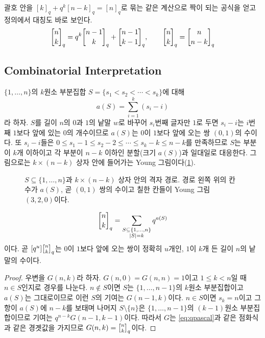 괄호 안을 $[k]_q+q^k[n-k]_q=[n]_q$로 묶는 같은 계산으로 짝이 되는 공식을 얻고 정의에서 대칭도 바로 보인다.
\[
\qbinom nk=q^k\qbinom{n-1}k+\qbinom{n-1}{k-1},\qquad\qbinom nk=\qbinom n{n-k}
\]

\subsection{Combinatorial Interpretation}

$\{1,\dots,n\}$의 $k$원소 부분집합 $S=\{s_1<s_2<\cdots<s_k\}$에 대해
\[
a(S)=\sum_{i=1}^k(s_i-i)
\]
라 하자. $S$를 길이 $n$의 $0$과 $1$의 낱말 $w$로 바꾸어 $s_i$번째 글자만 $1$로 두면 $s_i-i$는 $i$번째 $1$보다 앞에 있는 $0$의 개수이므로 $a(S)$는 $0$이 $1$보다 앞에 오는 쌍 $(0,1)$의 수이다. 또 $s_i-i$들은 $0\le s_1-1\le s_2-2\le\cdots\le s_k-k\le n-k$를 만족하므로 $S$는 부분이 $k$개 이하이고 각 부분이 $n-k$ 이하인 분할(크기 $a(S)$)과 일대일로 대응한다. 그림으로는 $k\times(n-k)$ 상자 안에 들어가는 Young 그림이다(\cref{fig:young}).

\begin{figure}[htbp]
\centering
{}
\caption{$S\subseteq\{1,\dots,n\}$과 $k\times(n-k)$ 상자 안의 격자 경로. 경로 왼쪽 위의 칸 수가 $a(S)$, 곧 $(0,1)$ 쌍의 수이고 칠한 칸들이 Young 그림 $(3,2,0)$이다.}
\label{fig:young}
\end{figure}

\begin{theorem}
\label{thm:qbinom-count}
\[
\qbinom nk=\sum_{\substack{S\subseteq\{1,\dots,n\}\\|S|=k}}q^{a(S)}
\]
이다. 곧 $[q^u]\qbinom nk$는 $0$이 $1$보다 앞에 오는 쌍이 정확히 $u$개인, $1$이 $k$개 든 길이 $n$의 낱말의 수이다.
\end{theorem}

\begin{proof}
우변을 $G(n,k)$라 하자. $G(n,0)=G(n,n)=1$이고 $1\le k<n$일 때 $n\in S$인지로 경우를 나눈다. $n\notin S$이면 $S$는 $\{1,\dots,n-1\}$의 $k$원소 부분집합이고 $a(S)$는 그대로이므로 이런 $S$의 기여는 $G(n-1,k)$이다. $n\in S$이면 $s_k=n$이고 그 항이 $a(S)$에 $n-k$를 보태며 나머지 $S\setminus\{n\}$은 $\{1,\dots,n-1\}$의 $(k-1)$원소 부분집합이므로 기여는 $q^{n-k}G(n-1,k-1)$이다. 따라서 $G$는 \cref{eq:qpascal}과 같은 점화식과 같은 경곗값을 가지므로 $G(n,k)=\qbinom nk$이다.
\end{proof}

